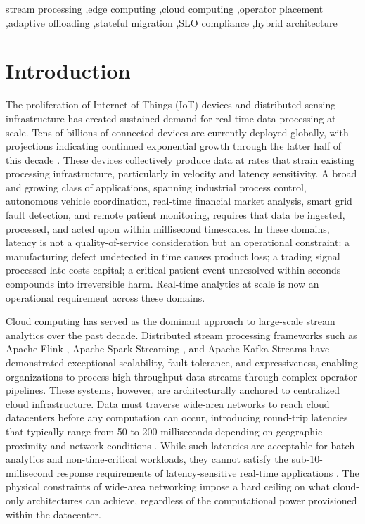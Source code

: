 \documentclass[preprint,review,12pt]{elsarticle}
\begin{document}
\begin{frontmatter}
\begin{keyword}
stream processing \sep edge computing \sep cloud computing \sep operator placement \sep adaptive offloading \sep stateful migration \sep SLO compliance \sep hybrid architecture
\end{keyword}

\end{frontmatter}

\linenumbers

\section{Introduction}\label{introduction}

The proliferation of Internet of Things (IoT) devices and distributed sensing infrastructure has created sustained demand for real-time data processing at scale. Tens of billions of connected devices are currently deployed globally, with projections indicating continued exponential growth through the latter half of this decade \cite{ericsson2023}. These devices collectively produce data at rates that strain existing processing infrastructure, particularly in velocity and latency sensitivity. A broad and growing class of applications, spanning industrial process control, autonomous vehicle coordination, real-time financial market analysis, smart grid fault detection, and remote patient monitoring, requires that data be ingested, processed, and acted upon within millisecond timescales. In these domains, latency is not a quality-of-service consideration but an operational constraint: a manufacturing defect undetected in time causes product loss; a trading signal processed late costs capital; a critical patient event unresolved within seconds compounds into irreversible harm. Real-time analytics at scale is now an operational requirement across these domains.

Cloud computing has served as the dominant approach to large-scale stream analytics over the past decade. Distributed stream processing frameworks such as Apache Flink \cite{carbone2015flink}, Apache Spark Streaming \cite{zaharia2013spark}, and Apache Kafka Streams \cite{kreps2011kafka} have demonstrated exceptional scalability, fault tolerance, and expressiveness, enabling organizations to process high-throughput data streams through complex operator pipelines. These systems, however, are architecturally anchored to centralized cloud infrastructure. Data must traverse wide-area networks to reach cloud datacenters before any computation can occur, introducing round-trip latencies that typically range from 50 to 200 milliseconds depending on geographic proximity and network conditions \cite{george2022hybrid}. While such latencies are acceptable for batch analytics and non-time-critical workloads, they cannot satisfy the sub-10-millisecond response requirements of latency-sensitive real-time applications \cite{immadisetty2025edge}. The physical constraints of wide-area networking impose a hard ceiling on what cloud-only architectures can achieve, regardless of the computational power provisioned within the datacenter.
\end{document}
